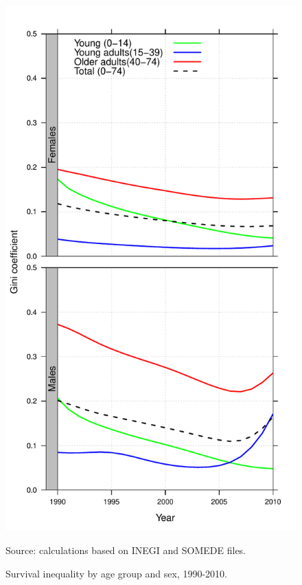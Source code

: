 \documentclass[11.5pt]{article}
\begin{document}
\begin{spacing}{1.5}
\begin{figure}[h!]
\centering
\caption{Survival inequality by age group and sex, 1990-2010.}
\label{fig:Gini}
\includegraphics[scale=.5]{Figures/Gini_fig.pdf}

 Source: calculations based on INEGI and SOMEDE files.
\end{figure}


\end{spacing}
\end{document}

